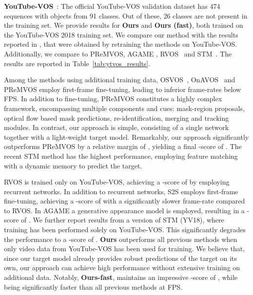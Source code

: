 \noindent\textbf{YouTube-VOS}~\cite{xu2018youtube2}: The official YouTube-VOS validation dataset has 474 sequences with objects from 91 classes. Out of these, 26 classes are not present in the training set. We provide results for {\bf Ours} and {\bf Ours (fast)}, both trained on the YouTube-VOS 2018 training set. We compare our method with the results reported in \cite{xu2018youtube}, that were obtained by retraining the methods on YouTube-VOS. Additionally, we compare to PReMVOS\cite{luiten2018premvos}, AGAME \cite{johnander2018generative}, RVOS~\cite{ventura2019rvos} and STM~\cite{oh2019video}. The results are reported in Table~\ref{tab:ytvos_results}. 

Among the methods using additional training data, OSVOS~\cite{caelles2017osvos}, OnAVOS~\cite{voigtlaender2017onavos} and PReMVOS employ first-frame fine-tuning, leading to inferior frame-rates below  FPS. In addition to fine-tuning, PReMVOS constitutes a highly complex framework, encompassing multiple components and cues: mask-region proposals, optical flow based mask predictions, re-identification, merging and tracking modules. In contrast, our approach is simple, consisting of a single network together with a light-weight target model. Remarkably, our approach significantly outperforms PReMVOS by a relative margin of , yielding a final -score of . The recent STM method has the highest performance, employing feature matching with a dynamic memory to predict the target.

RVOS is trained only on YouTube-VOS, achieving a -score of  by employing recurrent networks. In addition to recurrent networks, S2S employs first-frame fine-tuning, achieving a -score of  with a significantly slower frame-rate compared to RVOS. In AGAME a generative appearance model is employed, resulting in a -score of . We further report results from a version of STM (YV18), where training has been performed solely on YouTube-VOS. This significantly degrades the performance to a -score of . {\bf Ours} outperforms all previous methods when only video data from YouTube-VOS has been used for training. We believe that, since our target model already provides robust predictions of the target on its own, our approach can achieve high performance without extensive training on additional data. Notably, {\bf Ours-fast}, maintains an impressive -score of , while being significantly faster than all previous methods at  FPS.


